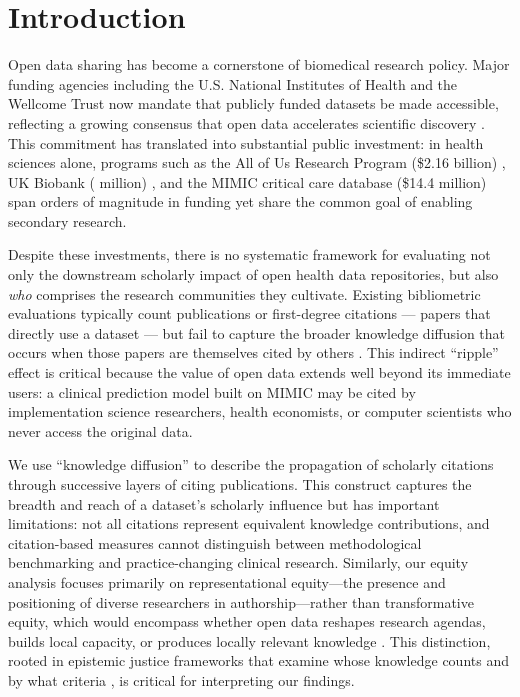 \documentclass[11pt]{article}
\begin{document}
\newpage


\section{Introduction}
\label{sec:introduction}

Open data sharing has become a cornerstone of biomedical research policy.
Major funding agencies including the U.S. National Institutes of Health \cite{nih2015sharing} and the Wellcome Trust \cite{wellcome2017openresearch} now mandate that publicly funded datasets be made accessible, reflecting a growing consensus that open data accelerates scientific discovery \cite{molloy2011opendata,wilkinson2016fair}.
This commitment has translated into substantial public investment: in health sciences alone, programs such as the All of Us Research Program (\$2.16 billion) \cite{allofus2019}, UK Biobank ( million) \cite{sudlow2015ukbiobank}, and the MIMIC critical care database (\$14.4 million) \cite{johnson2016mimic} span orders of magnitude in funding yet share the common goal of enabling secondary research.

Despite these investments, there is no systematic framework for evaluating not only the downstream scholarly impact of open health data repositories, but also \textit{who} comprises the research communities they cultivate.
Existing bibliometric evaluations typically count publications or first-degree citations --- papers that directly use a dataset --- but fail to capture the broader knowledge diffusion that occurs when those papers are themselves cited by others \cite{garfield1955citation,moed2005citation}.
This indirect ``ripple'' effect is critical because the value of open data extends well beyond its immediate users: a clinical prediction model built on MIMIC may be cited by implementation science researchers, health economists, or computer scientists who never access the original data.

We use ``knowledge diffusion'' to describe the propagation of scholarly citations through successive layers of citing publications. This construct captures the breadth and reach of a dataset's scholarly influence but has important limitations: not all citations represent equivalent knowledge contributions, and citation-based measures cannot distinguish between methodological benchmarking and practice-changing clinical research. Similarly, our equity analysis focuses primarily on representational equity---the presence and positioning of diverse researchers in authorship---rather than transformative equity, which would encompass whether open data reshapes research agendas, builds local capacity, or produces locally relevant knowledge \cite{couldry2019data}. This distinction, rooted in epistemic justice frameworks that examine whose knowledge counts and by what criteria \cite{fricker2007epistemic}, is critical for interpreting our findings.
\end{document}
